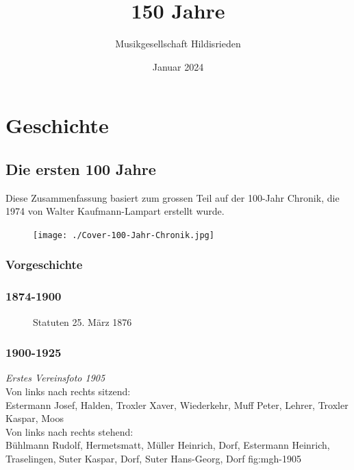 \documentclass[]{book}
\title{150 Jahre}
\author{Musikgesellschaft Hildisrieden}
\date{Januar 2024}
\begin{document}
\frontmatter
\maketitle

\tableofcontents

\mainmatter

\part{Geschichte}
\chapter{Die ersten 100 Jahre}

Diese Zusammenfassung basiert zum grossen Teil auf der 100-Jahr Chronik, die 1974 von Walter Kaufmann-Lampart erstellt wurde.
\begin{figure}[ht]
    \texttt{[image: ./Cover-100-Jahr-Chronik.jpg]}
\end{figure}
\section{Vorgeschichte}



\section{1874-1900}

\begin{figure}[ht]
    \centering
    \hfil
    \caption{Statuten 25. März 1876}
    \label{fig:Statuten-1874}
\end{figure}


\clearpage

\section{1900-1925}

{\emph{Erstes Vereinsfoto 1905}\\
    Von links nach rechts sitzend:\\
    Estermann Josef, Halden, Troxler Xaver, Wiederkehr, Muff Peter, Lehrer,
    Troxler Kaspar, Moos\\
    Von links nach rechts stehend:\\
    Bühlmann Rudolf, Hermetsmatt, Müller Heinrich, Dorf, Estermann Heinrich,
    Traselingen, Suter Kaspar, Dorf, Suter Hans-Georg, Dorf} {fig:mgh-1905}
\end{document}
